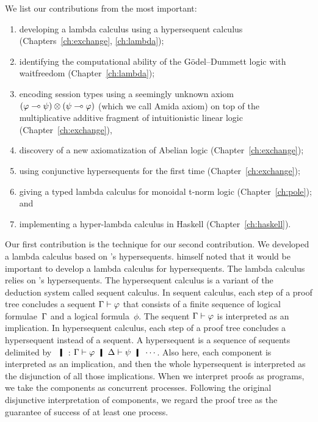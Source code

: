 We list our contributions from the most important:
\begin{enumerate}
 \item developing a lambda calculus using
       a hypersequent calculus (Chapters~\ref{ch:exchange}, \ref{ch:lambda});
 \item identifying the computational ability of the
       G\"odel--Dummett logic with waitfreedom (Chapter~\ref{ch:lambda});
 \item encoding session types using a seemingly unknown axiom
       $(\varphi\multimap \psi)\otimes(\psi\multimap \varphi)$ (which we call Amida axiom) on top
       of the multiplicative additive fragment of intuitionistic linear
       logic (Chapter~\ref{ch:exchange}),
 \item discovery of a new axiomatization of Abelian logic (Chapter~\ref{ch:exchange});
 \item using conjunctive hypersequents for the first time
       (Chapter~\ref{ch:exchange});
 \item giving a typed lambda calculus for monoidal t-norm logic
       (Chapter~\ref{ch:pole}); and
 \item implementing a hyper-lambda calculus in Haskell (Chapter~\ref{ch:haskell}).
\end{enumerate}

Our first contribution is the technique for our second contribution.
We developed a lambda calculus based on \citet{avron91}'s hypersequents.
\citet{avron91} himself noted that it would be important to develop a
lambda calculus for hypersequents.
The lambda calculus relies on \citet{avron91}'s hypersequents.
The hypersequent calculus is a
variant of the deduction system called sequent calculus.  In sequent
calculus, each step of a proof tree concludes a sequent $\Gamma\vdash\varphi$ that
consists of a finite sequence of logical formulae~$\Gamma$ and a logical
formula~$\phi$.  The sequent $\Gamma\vdash\varphi$ is
interpreted as an implication.  In hypersequent calculus, each step of a
proof tree concludes a hypersequent instead of a sequent.  A
hypersequent is a sequence of sequents delimited by $\hmid$:
$\G\vdash\phi\hmid \D\vdash\psi
\hmid \cdots$.  Also here, each component is interpreted as an
implication, and then the whole hypersequent is interpreted as the
disjunction of all those implications.
When we interpret proofs as programs, we take the components as
concurrent processes.  Following the original disjunctive
interpretation of components, we regard the proof tree as the guarantee of
success of at least one process.

